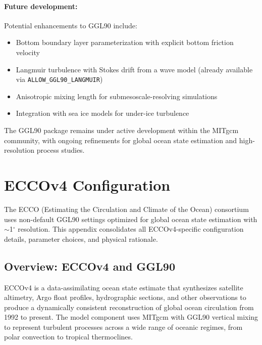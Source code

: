 \documentclass[12pt,letterpaper]{article}
\begin{document}
\paragraph{Future development:} Potential enhancements to GGL90 include:
\begin{itemize}
\item Bottom boundary layer parameterization with explicit bottom friction velocity
\item Langmuir turbulence with Stokes drift from a wave model (already available via \verb|ALLOW_GGL90_LANGMUIR|)
\item Anisotropic mixing length for submesoscale-resolving simulations
\item Integration with sea ice models for under-ice turbulence
\end{itemize}

The GGL90 package remains under active development within the MITgcm community, with ongoing refinements for global ocean state estimation and high-resolution process studies.

\appendix

\section{ECCOv4 Configuration}
\label{app:eccov4_config}

The ECCO (Estimating the Circulation and Climate of the Ocean) consortium uses non-default GGL90 settings optimized for global ocean state estimation with $\sim$1$^\circ$ resolution. This appendix consolidates all ECCOv4-specific configuration details, parameter choices, and physical rationale.

\subsection{Overview: ECCOv4 and GGL90}

ECCOv4 is a data-assimilating ocean state estimate that synthesizes satellite altimetry, Argo float profiles, hydrographic sections, and other observations to produce a dynamically consistent reconstruction of global ocean circulation from 1992 to present. The model component uses MITgcm with GGL90 vertical mixing to represent turbulent processes across a wide range of oceanic regimes, from polar convection to tropical thermoclines.
\end{document}
